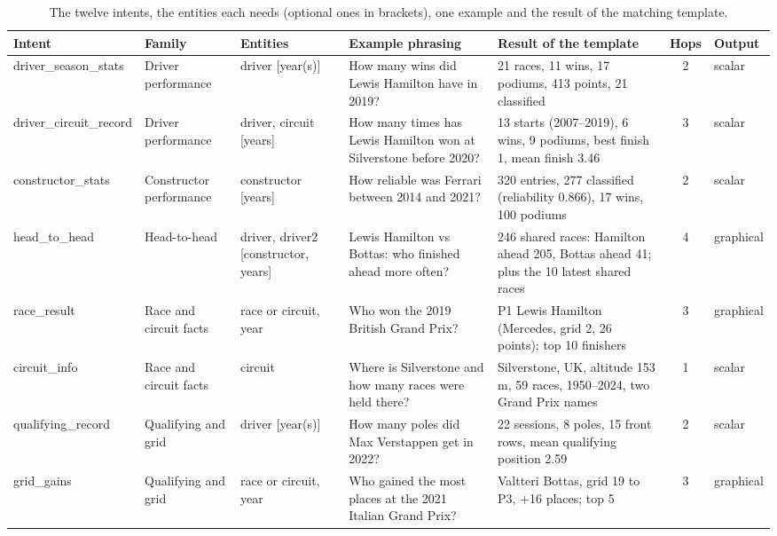 \documentclass[10pt,a4paper]{article}
\begin{document}
\begin{table}[t!]
\centering\scriptsize\setlength{\tabcolsep}{3pt}
\caption{The twelve intents, the entities each needs (optional ones in brackets), one example and the result of the matching template.}\label{tab:intents}
\begin{tabular}{@{}R{1.9cm}R{1.5cm}R{1.6cm}R{3.6cm}R{4.6cm}cR{1.0cm}@{}}
\toprule
Intent & Family & Entities & Example phrasing & Result of the template & Hops & Output \\
\midrule
driver\_\allowbreak{}season\_\allowbreak{}stats & Driver performance & driver [year(s)] & How many wins did Lewis Hamilton have in 2019? & 21 races, 11 wins, 17 podiums, 413 points, 21 classified & 2 & scalar \\
driver\_\allowbreak{}circuit\_\allowbreak{}record & Driver performance & driver, circuit [years] & How many times has Lewis Hamilton won at Silverstone before 2020? & 13 starts (2007--2019), 6 wins, 9 podiums, best finish 1, mean finish 3.46 & 3 & scalar \\
constructor\_\allowbreak{}stats & Constructor performance & constructor [years] & How reliable was Ferrari between 2014 and 2021? & 320 entries, 277 classified (reliability 0.866), 17 wins, 100 podiums & 2 & scalar \\
head\_\allowbreak{}to\_\allowbreak{}head & Head-to-head & driver, driver2 [constructor, years] & Lewis Hamilton vs Bottas: who finished ahead more often? & 246 shared races: Hamilton ahead 205, Bottas ahead 41; plus the 10 latest shared races & 4 & graphical \\
race\_\allowbreak{}result & Race and circuit facts & race or circuit, year & Who won the 2019 British Grand Prix? & P1 Lewis Hamilton (Mercedes, grid 2, 26 points); top 10 finishers & 3 & graphical \\
circuit\_\allowbreak{}info & Race and circuit facts & circuit & Where is Silverstone and how many races were held there? & Silverstone, UK, altitude 153 m, 59 races, 1950--2024, two Grand Prix names & 1 & scalar \\
qualifying\_\allowbreak{}record & Qualifying and grid & driver [year(s)] & How many poles did Max Verstappen get in 2022? & 22 sessions, 8 poles, 15 front rows, mean qualifying position 2.59 & 2 & scalar \\
grid\_\allowbreak{}gains & Qualifying and grid & race or circuit, year & Who gained the most places at the 2021 Italian Grand Prix? & Valtteri Bottas, grid 19 to P3, +16 places; top 5 & 3 & graphical \\

\end{tabular}
\end{table}
\end{document}
